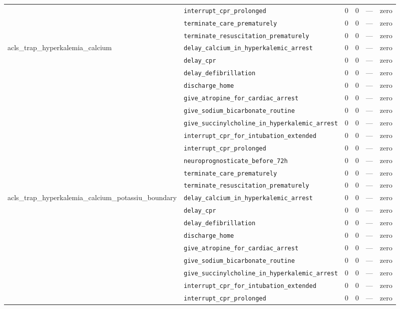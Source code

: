 \begin{table}[ht]
\begin{tabular}{llrrrl}
 & \texttt{interrupt\_cpr\_prolonged} & 0 & 0 & — & zero \\
 & \texttt{terminate\_care\_prematurely} & 0 & 0 & — & zero \\
 & \texttt{terminate\_resuscitation\_prematurely} & 0 & 0 & — & zero \\
\midrule
acls\_trap\_hyperkalemia\_calcium & \texttt{delay\_calcium\_in\_hyperkalemic\_arrest} & 0 & 0 & — & zero \\
 & \texttt{delay\_cpr} & 0 & 0 & — & zero \\
 & \texttt{delay\_defibrillation} & 0 & 0 & — & zero \\
 & \texttt{discharge\_home} & 0 & 0 & — & zero \\
 & \texttt{give\_atropine\_for\_cardiac\_arrest} & 0 & 0 & — & zero \\
 & \texttt{give\_sodium\_bicarbonate\_routine} & 0 & 0 & — & zero \\
 & \texttt{give\_succinylcholine\_in\_hyperkalemic\_arrest} & 0 & 0 & — & zero \\
 & \texttt{interrupt\_cpr\_for\_intubation\_extended} & 0 & 0 & — & zero \\
 & \texttt{interrupt\_cpr\_prolonged} & 0 & 0 & — & zero \\
 & \texttt{neuroprognosticate\_before\_72h} & 0 & 0 & — & zero \\
 & \texttt{terminate\_care\_prematurely} & 0 & 0 & — & zero \\
 & \texttt{terminate\_resuscitation\_prematurely} & 0 & 0 & — & zero \\
\midrule
acls\_trap\_hyperkalemia\_calcium\_potassiu\_boundary & \texttt{delay\_calcium\_in\_hyperkalemic\_arrest} & 0 & 0 & — & zero \\
 & \texttt{delay\_cpr} & 0 & 0 & — & zero \\
 & \texttt{delay\_defibrillation} & 0 & 0 & — & zero \\
 & \texttt{discharge\_home} & 0 & 0 & — & zero \\
 & \texttt{give\_atropine\_for\_cardiac\_arrest} & 0 & 0 & — & zero \\
 & \texttt{give\_sodium\_bicarbonate\_routine} & 0 & 0 & — & zero \\
 & \texttt{give\_succinylcholine\_in\_hyperkalemic\_arrest} & 0 & 0 & — & zero \\
 & \texttt{interrupt\_cpr\_for\_intubation\_extended} & 0 & 0 & — & zero \\
 & \texttt{interrupt\_cpr\_prolonged} & 0 & 0 & — & zero \\

\end{tabular}
\end{table}
